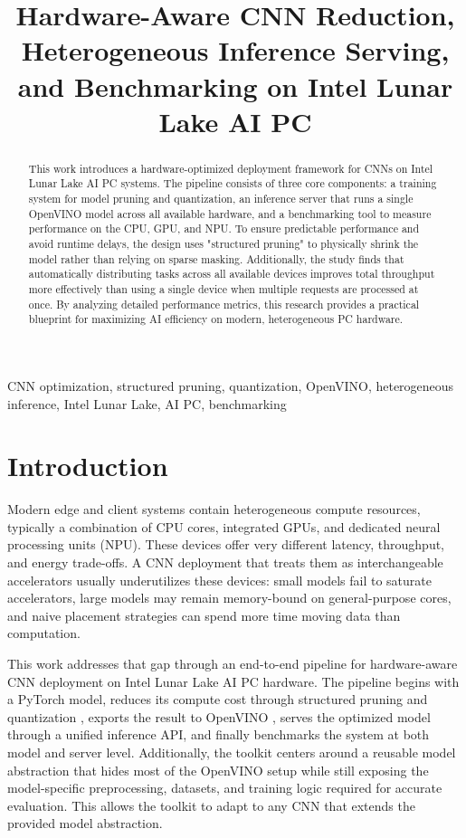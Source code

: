 \documentclass[conference]{IEEEtran}
\title{Hardware-Aware CNN Reduction, Heterogeneous Inference Serving, and Benchmarking on Intel Lunar Lake AI PC}
\author{%
\IEEEauthorblockN{Ritik Agarwal}
\IEEEauthorblockA{%
MTech DSBA\\
Indian Institute of Science, Bengaluru\\
ritikagarwal@iisc.ac.in
}
}
\begin{document}
\maketitle

\begin{abstract}
This work introduces a hardware-optimized deployment framework for CNNs on Intel Lunar Lake AI PC systems. The pipeline consists of three core components: a training system for model pruning and quantization, an inference server that runs a single OpenVINO model across all available hardware, and a benchmarking tool to measure performance on the CPU, GPU, and NPU. To ensure predictable performance and avoid runtime delays, the design uses "structured pruning" to physically shrink the model rather than relying on sparse masking. Additionally, the study finds that automatically distributing tasks across all available devices improves total throughput more effectively than using a single device when multiple requests are processed at once. By analyzing detailed performance metrics, this research provides a practical blueprint for maximizing AI efficiency on modern, heterogeneous PC hardware.
\end{abstract}

\begin{IEEEkeywords}
CNN optimization, structured pruning, quantization, OpenVINO, heterogeneous inference, Intel Lunar Lake, AI PC, benchmarking
\end{IEEEkeywords}

\section{Introduction}
Modern edge and client systems contain heterogeneous compute resources, typically a combination of CPU cores, integrated GPUs, and dedicated neural processing units (NPU). These devices offer very different latency, throughput, and energy trade-offs. A CNN deployment that treats them as interchangeable accelerators usually underutilizes these devices: small models fail to saturate accelerators, large models may remain memory-bound on general-purpose cores, and naive placement strategies can spend more time moving data than computation.

This work addresses that gap through an end-to-end pipeline for hardware-aware CNN deployment on Intel Lunar Lake AI PC hardware. The pipeline begins with a PyTorch model, reduces its compute cost through structured pruning and quantization \cite{li2017pruning,he2017channel,jacob2018quantization,krishnamoorthi2018quantizing}, exports the result to OpenVINO \cite{demidovskij2019openvino}, serves the optimized model through a unified inference API, and finally benchmarks the system at both model and server level. Additionally, the toolkit centers around a reusable model abstraction that hides most of the OpenVINO setup while still exposing the model-specific preprocessing, datasets, and training logic required for accurate evaluation. This allows the toolkit to adapt to any CNN that extends the provided model abstraction.
\end{document}
